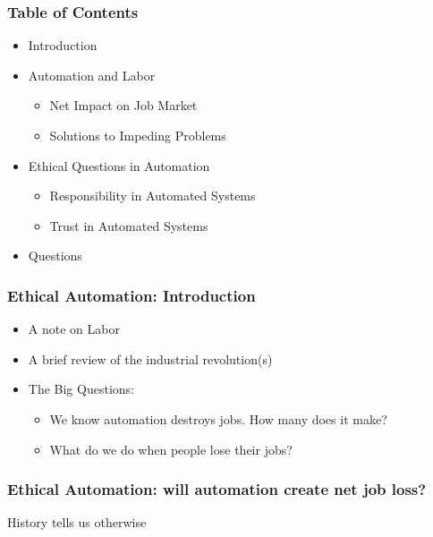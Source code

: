 \begin{frame}
  \frametitle{ Table of Contents}
  \begin{itemize}
    \item Introduction
    \item Automation and Labor
      \begin{itemize}
        \item Net Impact on Job Market
        \item Solutions to Impeding Problems
      \end{itemize}
    \item Ethical Questions in Automation
      \begin{itemize}
        \item Responsibility in Automated Systems
        \item Trust in Automated Systems
      \end{itemize}
    \item Questions
  \end{itemize}
\end{frame}


\begin{frame}
  \frametitle{ Ethical Automation: Introduction}
  \begin{itemize}
    \item A note on Labor
    \item A brief review of the industrial revolution(s)
    \item The Big Questions:
      \begin{itemize}
        \item We know automation destroys jobs.  How many does it make?
        \item What do we do when people lose their jobs?
      \end{itemize}
  \end{itemize}
\end{frame}


\begin{frame}
  \frametitle{ Ethical Automation: will automation create net job loss?}
  {\Large History tells us otherwise}
\end{frame}

